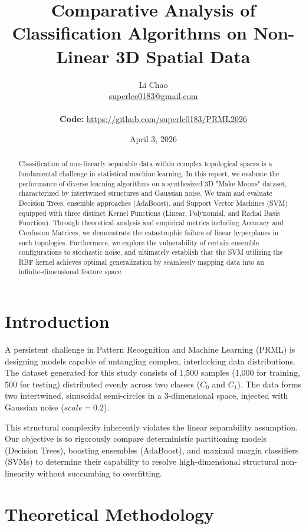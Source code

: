 \documentclass[12pt,a4paper]{article}
\title{\textbf{\Large Comparative Analysis of Classification Algorithms on Non-Linear 3D Spatial Data}}
\author{
    Li Chao \\ 
    \href{mailto:superlee0183@gmail.com}{superlee0183@gmail.com} \\
    \vspace{0.1cm} \\
    \normalsize \textbf{Code:} \url{https://github.com/superlc0183/PRML2026}
}
\date{April 3, 2026}
\begin{document}
\maketitle 

\begin{abstract}
Classification of non-linearly separable data within complex topological spaces is a fundamental challenge in statistical machine learning. In this report, we evaluate the performance of diverse learning algorithms on a synthesized 3D "Make Moons" dataset, characterized by intertwined structures and Gaussian noise. We train and evaluate Decision Trees, ensemble approaches (AdaBoost), and Support Vector Machines (SVM) equipped with three distinct Kernel Functions (Linear, Polynomial, and Radial Basis Function). Through theoretical analysis and empirical metrics including Accuracy and Confusion Matrices, we demonstrate the catastrophic failure of linear hyperplanes in such topologies. Furthermore, we explore the vulnerability of certain ensemble configurations to stochastic noise, and ultimately establish that the SVM utilizing the RBF kernel achieves optimal generalization by seamlessly mapping data into an infinite-dimensional feature space.
\end{abstract}

\newpage
\renewcommand{\contentsname}{\large\bfseries\filcenter Contents}
\tableofcontents
\newpage

\section{Introduction}
A persistent challenge in Pattern Recognition and Machine Learning (PRML) is designing models capable of untangling complex, interlocking data distributions. The dataset generated for this study consists of 1,500 samples (1,000 for training, 500 for testing) distributed evenly across two classes ($C_0$ and $C_1$). The data forms two intertwined, sinusoidal semi-circles in a 3-dimensional space, injected with Gaussian noise ($scale=0.2$). 

This structural complexity inherently violates the linear separability assumption. Our objective is to rigorously compare deterministic partitioning models (Decision Trees), boosting ensembles (AdaBoost), and maximal margin classifiers (SVMs) to determine their capability to resolve high-dimensional structural non-linearity without succumbing to overfitting.

\section{Theoretical Methodology}
\end{document}
